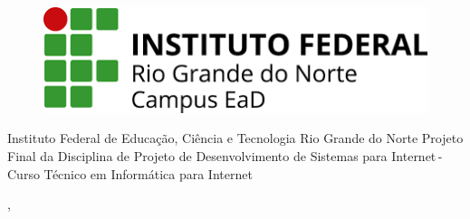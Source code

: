   \begin{capa}%
    \begin{figure}[h!]%
        \centering%
        \includegraphics[scale=0.5]{figs/download.png}%
      \end{figure}%
    \center
	\ABNTEXchapterfont\large{Instituto Federal de Educação, Ciência e Tecnologia Rio Grande do Norte\newline
	Projeto Final da Disciplina de Projeto de Desenvolvimento de Sistemas para Internet\,-\,Curso Técnico em Informática para Internet}

    \vfill
    \ABNTEXchapterfont\bfseries\LARGE\imprimirtitulo
    \vfill

	\ABNTEXchapterfont\large\imprimirautor
	\vfill
%
    \large\imprimirlocal, \large\imprimirdata

    \vspace*{1cm}
  \end{capa}
